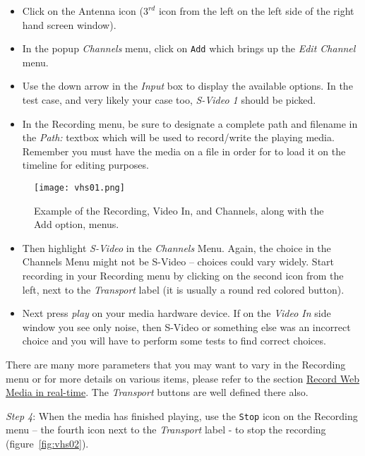 \begin{itemize}
    \item Click on the Antenna icon ($3^{rd}$ icon from the left on the left side of the right hand screen window).
    \item In the popup \textit{Channels} menu, click on \texttt{Add} which brings up the \textit{Edit Channel} menu.
    \item Use the down arrow in the \textit{Input} box to display the available options.  In the test case, and very likely your case too, \textit{S-Video 1} should be picked.
    \item In the Recording menu, be sure to designate a complete path and filename in the \textit{Path:} textbox which will be used to record/write the playing media.  Remember you must have the media on a file in order for \CGG{} to load it on the timeline for editing purposes.    
\end{itemize}

\begin{figure}[htpb]
    \centering
    \texttt{[image: vhs01.png]}
    \caption{Example of the Recording, Video In, and Channels, along with the Add option, menus.}
    \label{fig:vhs01}
\end{figure}

\begin{itemize}
    \item Then highlight \textit{S-Video} in the \textit{Channels} Menu.  Again, the choice in the Channels Menu might not be S-Video -- choices could vary widely. Start recording in your Recording menu by clicking on the second icon from the left, next to the \textit{Transport} label (it is usually a round red colored button).
    \item Next press \textit{play} on your media hardware device.  If on the \textit{Video In} side window you see only noise, then S-Video or something else was an incorrect choice and you will have to perform some tests to find correct choices.
\end{itemize}

There are many more parameters that you may want to vary in the Recording menu or for more details on various items, please refer to the section \hyperref[sec:record_web_media_rt]{Record Web Media in real-time}. The \textit{Transport} buttons are well defined there also.

\textit{Step 4}: When the media has finished playing, use the \texttt{Stop} icon on the Recording menu – the fourth icon next to the \textit{Transport} label - to stop the recording (figure~\ref{fig:vhs02}).

